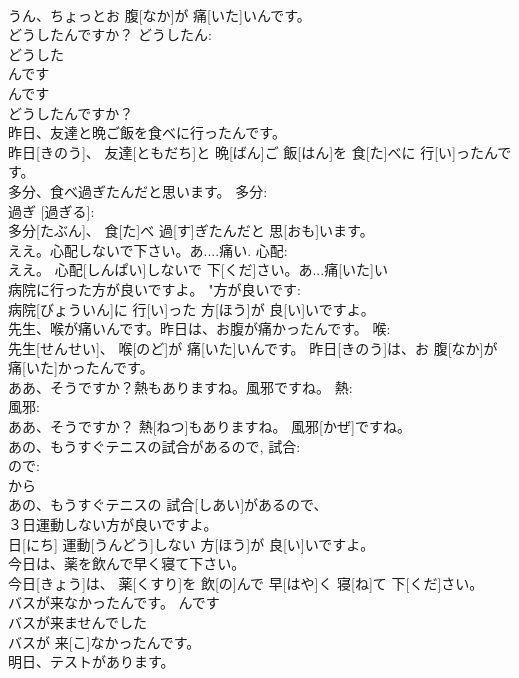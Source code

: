 \documentclass[8pt]{extreport}
\begin{document}
\begin{CJK}{UTF8}{min}
\\	うん、ちょっとお 腹[なか]が 痛[いた]いんです。		
\\	どうしたんですか？	どうしたん: 
\\	どうした
\\	んです 
\\	んです 
\\	どうしたんですか？		
\\	昨日、友達と晩ご飯を食べに行ったんです。	
\\	昨日[きのう]、 友達[ともだち]と 晩[ばん]ご 飯[はん]を 食[た]べに 行[い]ったんです。	
\\	多分、食べ過ぎたんだと思います。	多分: 
\\	過ぎ [過ぎる]:
\\	多分[たぶん]、 食[た]べ 過[す]ぎたんだと 思[おも]います。	
\\	ええ。心配しないで下さい。あ....痛い.	心配: 
\\	ええ。 心配[しんぱい]しないで 下[くだ]さい。あ...痛[いた]い	
\\	病院に行った方が良いですよ。	"方が良いです: 
\\	病院[びょういん]に 行[い]った 方[ほう]が 良[い]いですよ。	
\\	先生、喉が痛いんです。昨日は、お腹が痛かったんです。	喉: 
\\	先生[せんせい]、 喉[のど]が 痛[いた]いんです。 昨日[きのう]は、お 腹[なか]が 痛[いた]かったんです。		
\\	ああ、そうですか？熱もありますね。風邪ですね。	熱: 
\\	風邪: 
\\	ああ、そうですか？ 熱[ねつ]もありますね。 風邪[かぜ]ですね。		
\\	あの、もうすぐテニスの試合があるので,	試合: 
\\	ので: 
\\	から 
\\	あの、もうすぐテニスの 試合[しあい]があるので、	
\\	３日運動しない方が良いですよ。	
\\	日[にち] 運動[うんどう]しない 方[ほう]が 良[い]いですよ。	
\\	今日は、薬を飲んで早く寝て下さい。	
\\	今日[きょう]は、 薬[くすり]を 飲[の]んで 早[はや]く 寝[ね]て 下[くだ]さい。	
\\	バスが来なかったんです。	んです 
\\	バスが来ませんでした 
\\	バスが 来[こ]なかったんです。	
\\	明日、テストがあります。	

\end{CJK}
\end{document}
